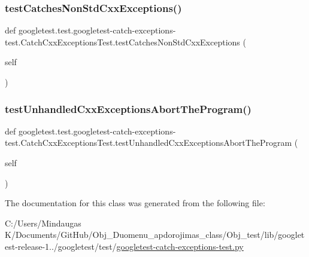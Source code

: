 \subsubsection{\texorpdfstring{testCatchesNonStdCxxExceptions()}{testCatchesNonStdCxxExceptions()}}
{\footnotesize\ttfamily def googletest.\+test.\+googletest-\/catch-\/exceptions-\/test.\+Catch\+Cxx\+Exceptions\+Test.\+test\+Catches\+Non\+Std\+Cxx\+Exceptions (\begin{DoxyParamCaption}\item[{}]{self }\end{DoxyParamCaption})}

\mbox{\label{classgoogletest_1_1test_1_1googletest-catch-exceptions-test_1_1_catch_cxx_exceptions_test_a2c15348b090e12bea15c99b8d90ce8c0}} 
\subsubsection{\texorpdfstring{testUnhandledCxxExceptionsAbortTheProgram()}{testUnhandledCxxExceptionsAbortTheProgram()}}
{\footnotesize\ttfamily def googletest.\+test.\+googletest-\/catch-\/exceptions-\/test.\+Catch\+Cxx\+Exceptions\+Test.\+test\+Unhandled\+Cxx\+Exceptions\+Abort\+The\+Program (\begin{DoxyParamCaption}\item[{}]{self }\end{DoxyParamCaption})}



The documentation for this class was generated from the following file\+:\begin{DoxyCompactItemize}
\item 
C\+:/\+Users/\+Mindaugas K/\+Documents/\+Git\+Hub/\+Obj\+\_\+\+Duomenu\+\_\+apdorojimas\+\_\+class/\+Obj\+\_\+test/lib/googletest-\/release-\/1../googletest/test/\mbox{\hyperlink{_obj__test_2lib_2googletest-release-1_88_81_2googletest_2test_2googletest-catch-exceptions-test_8py}{googletest-\/catch-\/exceptions-\/test.\+py}}\end{DoxyCompactItemize}
